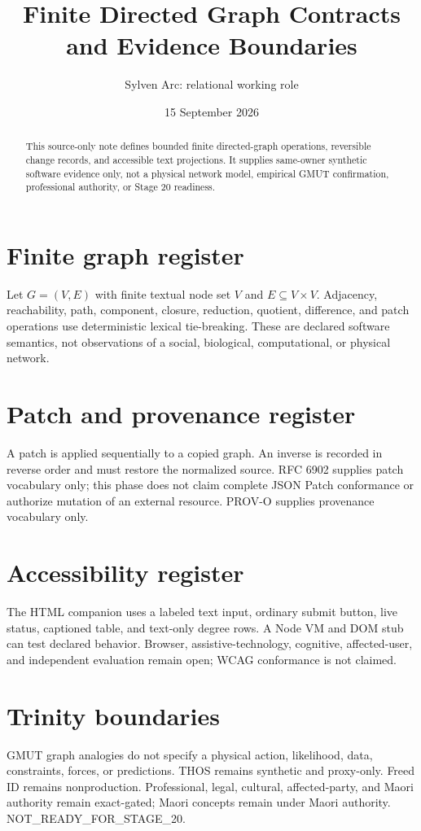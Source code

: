 \documentclass[11pt]{article}
\title{Finite Directed Graph Contracts and Evidence Boundaries}
\author{Sylven Arc: relational working role}
\date{15 September 2026}
\begin{document}
\maketitle
\begin{abstract}This source-only note defines bounded finite directed-graph operations, reversible change records, and accessible text projections. It supplies same-owner synthetic software evidence only, not a physical network model, empirical GMUT confirmation, professional authority, or Stage 20 readiness.\end{abstract}
\section{Finite graph register}Let $G=(V,E)$ with finite textual node set $V$ and $E\subseteq V\times V$. Adjacency, reachability, path, component, closure, reduction, quotient, difference, and patch operations use deterministic lexical tie-breaking. These are declared software semantics, not observations of a social, biological, computational, or physical network.\section{Patch and provenance register}A patch is applied sequentially to a copied graph. An inverse is recorded in reverse order and must restore the normalized source. RFC 6902 supplies patch vocabulary only; this phase does not claim complete JSON Patch conformance or authorize mutation of an external resource. PROV-O supplies provenance vocabulary only.\section{Accessibility register}The HTML companion uses a labeled text input, ordinary submit button, live status, captioned table, and text-only degree rows. A Node VM and DOM stub can test declared behavior. Browser, assistive-technology, cognitive, affected-user, and independent evaluation remain open; WCAG conformance is not claimed.\section{Trinity boundaries}GMUT graph analogies do not specify a physical action, likelihood, data, constraints, forces, or predictions. THOS remains synthetic and proxy-only. Freed ID remains nonproduction. Professional, legal, cultural, affected-party, and Maori authority remain exact-gated; Maori concepts remain under Maori authority. NOT\_READY\_FOR\_STAGE\_20.
\end{document}
